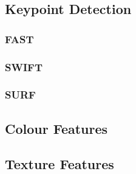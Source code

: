 \subsection{Keypoint Detection}
\subsubsection{FAST}
\subsubsection{SWIFT}
\subsubsection{SURF}
\subsection{Colour Features}
\subsection{Texture Features}


